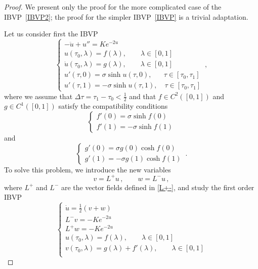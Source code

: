 \documentclass[10pt]{amsart}
\begin{document}
\begin{proof}
We present only the proof for the more complicated case of the IBVP~\eqref{IBVP2}; the proof for the simpler IBVP~\eqref{IBVP} is a trivial adaptation.

Let us consider first the IBVP
\begin{equation} \label{IBVP3}
\begin{cases}
- \ddot{u} + u'' = K e^{- 2u} \\
u(\tau_0,\lambda)=f(\lambda), \quad \quad \lambda \in [0,1] \\
\dot{u}(\tau_0,\lambda)=g(\lambda), \quad \quad \lambda \in [0,1] \\
u'(\tau,0) = \sigma \sinh u(\tau,0), \quad \,\,\,\, \tau\in [\tau_0, \tau_1] \\
u'(\tau,1) = - \sigma \sinh u(\tau,1), \quad \tau\in [\tau_0, \tau_1]
\end{cases} \, ,
\end{equation}
where we assume that $\Delta \tau = \tau_1 - \tau_0 < \frac12$ and that $f \in C^2([0,1])$ and $g \in C^1([0,1])$ satisfy the compatibility conditions
\begin{equation} \label{compatibility1}
\begin{cases}
f'(0)=\sigma \sinh f(0) \\
f'(1)=-\sigma \sinh f(1)
\end{cases}
\end{equation}
and
\begin{equation} \label{compatibility2}
\begin{cases}
g'(0)=\sigma g(0) \cosh f(0) \\
g'(1)=-\sigma g(1) \cosh f(1)
\end{cases} \, .
\end{equation}
To solve this problem, we introduce the new variables
\begin{equation}
v = L^+ u \, , \qquad w = L^- u \, ,
\end{equation}
where $L^+$ and $L^-$ are the vector fields defined in \eqref{L+-}, and study the first order IBVP
\begin{equation} \label{IBVPfirstorder}
\begin{cases}
\dot{u} = \frac12 (v + w) \\
L^- v = - K e^{- 2u} \\
L^+ w = - K e^{- 2u} \\
u(\tau_0,\lambda)=f(\lambda), \quad \quad \lambda \in [0,1] \\
v(\tau_0,\lambda)=g(\lambda) + f'(\lambda), \quad \quad \lambda \in [0,1] \\

\end{cases}
\end{equation}
\end{proof}
\end{document}
